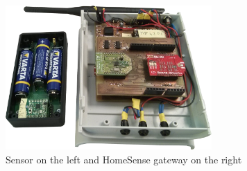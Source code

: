 \begin{figure}[H]\begin{center}
 \centering
  \captionsetup{justification=centering}
  \includegraphics[width=0.7\textwidth]{pictures/proposal/homesense}
  \caption{Sensor on the left and HomeSense gateway on the right \label{fig:Proposal-HomeSense}}
\end{center}\end{figure}

